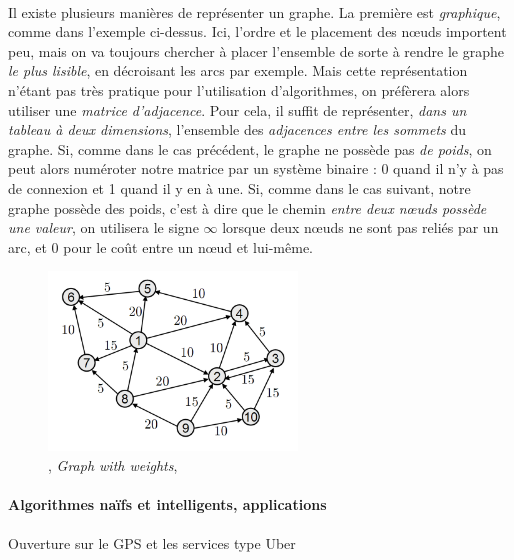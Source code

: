 \paragraph{} Il existe plusieurs manières de représenter un graphe. La première est \emph{graphique}, comme dans 
l'exemple ci-dessus. Ici, l'ordre et le placement des n\oe{}uds importent peu, mais on va toujours chercher à placer
l'ensemble de sorte à rendre le graphe \emph{le plus lisible}, en décroisant les arcs par exemple. Mais cette représentation
n'étant pas très pratique pour l'utilisation d'algorithmes, on préfèrera alors utiliser une \emph{matrice d'adjacence}.
Pour cela, il suffit de représenter, \emph{dans un tableau à deux dimensions}, l'ensemble des \emph{adjacences entre les
sommets} du graphe. Si, comme dans le cas précédent, le graphe ne possède pas \emph{de poids}, on peut alors numéroter
notre matrice par un système binaire : 0 quand il n'y à pas de connexion et 1 quand il y en à une. Si, comme dans le cas
suivant, notre graphe possède des poids, c'est à dire que le chemin \emph{entre deux n\oe{}uds possède une valeur}, on
utilisera le signe $\infty$ lorsque deux n\oe{}uds ne sont pas reliés par un arc, et 0 pour le coût entre un n\oe{}ud et
lui-même.

\begin{figure}[h]
    \centering
    \includegraphics[width=250px]{chapters/03/images/weighted_graph.png}
    \caption{\label{weighted_graph}, \emph{Graph with weights}, \cite{GraphTheory1}}
\end{figure}

\paragraph{Algorithmes naïfs et intelligents, applications}

\paragraph{} Ouverture sur le GPS et les services type Uber

